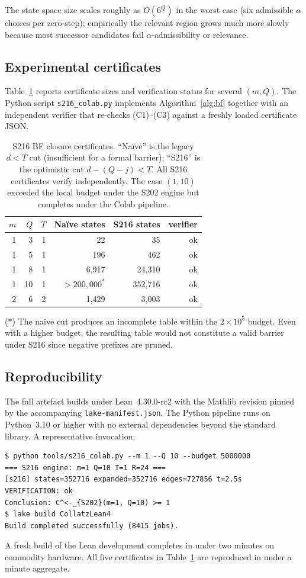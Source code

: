 \documentclass[11pt,a4paper]{article}
\theoremstyle{plain}
\theoremstyle{definition}
\theoremstyle{plain}
\begin{document}
The state space size scales roughly as $O(6^Q)$ in the worst case
(six admissible $\alpha$ choices per zero-step); empirically the
relevant region grows much more slowly because most successor
candidates fail $\alpha$-admissibility or relevance.

\subsection{Experimental certificates}
Table~\ref{tab:certs} reports certificate sizes and verification
status for several $(m, Q)$. The Python script
\texttt{s216\_colab.py} implements Algorithm~\ref{alg:bf} together
with an independent verifier that re-checks (C1)--(C3) against a
freshly loaded certificate JSON.

\begin{table}[h]
\centering
\caption{S216 BF closure certificates. ``Naïve'' is the legacy
$d < T$ cut (insufficient for a formal barrier); ``S216'' is the
optimistic cut $d - (Q-j) < T$. All S216 certificates verify
independently. The case $(1, 10)$ exceeded the local budget under the
S202 engine but completes under the Colab pipeline.}
\label{tab:certs}
\begin{tabular}{rrrrrr}
\toprule
$m$ & $Q$ & $T$ & Naïve states & S216 states & verifier \\
\midrule
1 & 3  & 1 & 22                 & 35           & ok \\
1 & 5  & 1 & 196                & 462          & ok \\
1 & 8  & 1 & 6{,}917            & 24{,}310     & ok \\
1 & 10 & 1 & $>\!200{,}000^{*}$ & 352{,}716    & ok \\
2 & 6  & 2 & 1{,}429            & 3{,}003      & ok \\
\bottomrule
\end{tabular}
\end{table}

\noindent ($*$) The naïve cut produces an incomplete table within the
$2 \times 10^5$ budget. Even with a higher budget, the resulting
table would not constitute a valid barrier under S216 since negative
prefixes are pruned.

\subsection{Reproducibility}
The full artefact builds under Lean~4.30.0-rc2 with the Mathlib
revision pinned by the accompanying \texttt{lake-manifest.json}. The
Python pipeline runs on Python~3.10 or higher with no external
dependencies beyond the standard library. A representative invocation:
\begin{lstlisting}
$ python tools/s216_colab.py --m 1 --Q 10 --budget 5000000
=== S216 engine: m=1 Q=10 T=1 R=24 ===
[s216] states=352716 expanded=352716 edges=727856 t=2.5s
VERIFICATION: ok
Conclusion: C^<-_{S202}(m=1, Q=10) >= 1
$ lake build CollatzLean4
Build completed successfully (8415 jobs).
\end{lstlisting}
A fresh build of the Lean development completes in under two minutes
on commodity hardware. All five certificates in Table~\ref{tab:certs}
are reproduced in under a minute aggregate.
\end{document}

